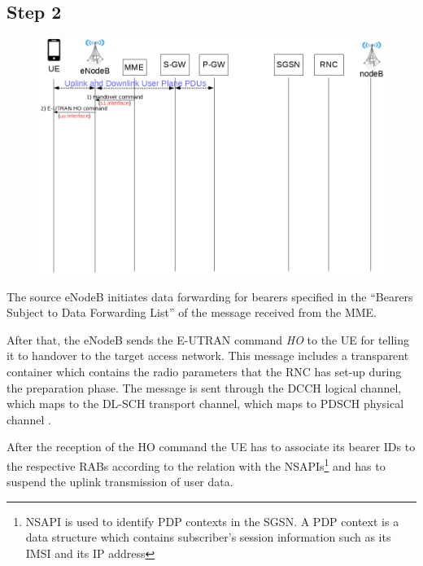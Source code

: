 \subsection*{Step 2}
\begin{figure}[!htb]
	\centering
	\includegraphics[width=0.9\linewidth]{img/execution-2.png}
	\label{fig:exec-2}
\end{figure}

The source eNodeB initiates data forwarding for bearers specified in the
``Bearers Subject to Data Forwarding List'' of the message received from the MME.

After that, the eNodeB sends the E-UTRAN command \emph{HO} to the UE for telling
it to handover to the target access network. This message includes a transparent
container which contains the radio parameters that the RNC has set-up during the
preparation phase. The message is sent through the DCCH logical channel, which
maps to the DL-SCH transport channel, which maps to PDSCH physical channel \cite{channels}.

After the reception of the HO command the UE has to associate its bearer IDs to
the respective RABs according to the relation with the NSAPIs\footnote{NSAPI is
used to identify PDP contexts in the SGSN. A PDP context is a data structure
which contains subscriber's session information such as its IMSI and its IP
address} and has to suspend the uplink transmission of user data.



